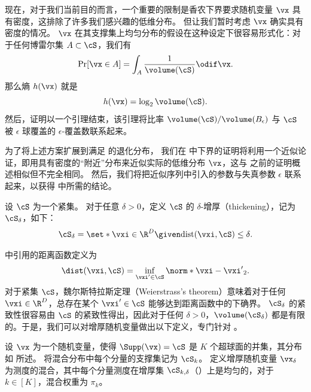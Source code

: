 \documentclass[../../book-main_zh.tex]{subfiles}
\begin{document}
现在，对于我们当前目的而言，一个重要的限制是香农下界要求随机变量 $\vx$ 具有密度，这排除了许多我们感兴趣的低维分布。
但让我们暂时考虑 $\vx$ 确实具有密度的情况。
$\vx$ 在其支撑集上均匀分布的假设在这种设定下很容易形式化：对于任何博雷尔集 $A \subset \cS$，我们有
\begin{equation}
    \Pr[\vx \in A] = \int_{A} \frac{1}{\volume(\cS)} \odif \vx.
\end{equation}
那么熵 $h(\vx)$ 就是
\begin{equation}
    h(\vx) = \log_2 \volume(\cS).
\end{equation}
然后，证明以一个引理结束，该引理将比率 $\volume(\cS) / \volume(B_{\epsilon})$ 与 $\cS$ 被 $\epsilon$ 球覆盖的 $\epsilon$-覆盖数联系起来。

为了将上述方案扩展到满足  的退化分布，
我们在  中下界的证明将利用一个近似论证，即用具有密度的“附近”分布来近似实际的低维分布 $\vx$，这与  之前的证明概述相似但不完全相同。
然后，我们将把近似序列中引入的参数与失真参数 $\epsilon$ 联系起来，以获得  中所需的结论。

\begin{definition}\label{def:thickening-set}
    设 $\cS$ 为一个紧集。
    对于任意 $\delta > 0$，定义 $\cS$ 的 $\delta$-增厚（thickening），记为 $\cS_{\delta}$，如下：
    \begin{equation}
        \cS_{\delta} = \set*{\vxi \in \R^D \given \mathrm{dist}(\vxi, \cS) \leq
        \delta}.
    \end{equation}
\end{definition}
 中引用的距离函数定义为
\begin{equation}\label{eq:dist-func}
    \dist(\vxi, \cS) = \inf_{\vxi' \in \cS} \norm*{\vxi - \vxi'}_2.
\end{equation}
对于紧集 $\cS$，魏尔斯特拉斯定理（Weierstrass's theorem）意味着对于任何 $\vxi \in \R^D$，总存在某个 $\vxi' \in \cS$ 能够达到距离函数中的下确界。
$\cS_{\delta}$ 的紧致性很容易由 $\cS$ 的紧致性得出，因此对于任何 $\delta > 0$，$\volume(\cS_{\delta})$ 都是有限的。于是，我们可以对增厚随机变量做出以下定义，专门针对 。

\begin{definition}\label{def:thickening-rv-uos}
    设 $\vx$ 为一个随机变量，使得 $\Supp(\vx) = \cS$ 是 $K$ 个超球面的并集，其分布如  所述。
    将混合分布中每个分量的支撑集记为 $\cS_k$。
    定义增厚随机变量 $\vx_{\delta}$ 为测度的混合，其中每个分量测度在增厚集 $\cS_{k, \delta}$（）上是均匀的，对于 $k \in [K]$，混合权重为 $\pi_k$。
\end{definition}
\end{document}
